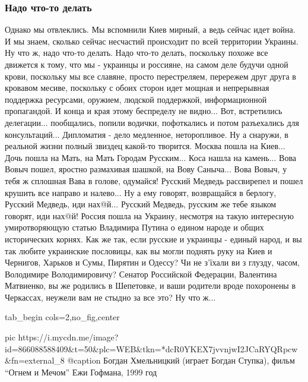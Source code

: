  
 
 
 
 

\subsubsection{Надо что-то делать}

Однако мы отвлеклись. Мы вспомнили Киев мирный, а ведь сейчас идет война. И мы
знаем, сколько сейчас несчастий происходит по всей территории Украины. Ну что
ж, надо что-то делать. Надо что-то делать, поскольку похоже все движется к
тому, что мы - украинцы и россияне, на самом деле будучи одной крови, поскольку
мы все славяне, просто перестреляем, перережем друг друга в кровавом месиве,
поскольку с обоих сторон идет мощная и непрерывная поддержка ресурсами,
оружием, людской поддержкой, информационной пропагандой. И конца и края этому
беспределу не видно... Вот, встретились делегации... пообщались, попили
водички, пофоткались и потом разъехались для консультаций... Дипломатия - дело
медленное, неторопливое. Ну а снаружи, в реальной жизни полный звиздец какой-то
творится. Москва пошла на Киев... Дочь пошла на Мать, на Мать Городам
Русским... Коса нашла на камень... Вова Вовыч пошел, яростно размахивая шашкой,
на Вову Саныча... Вова Вовыч, у тебя ж сплошная Вава в голове, одумайся! Русский Медведь рассвирепел и пошел крушить все направо и
налево... Ну а ему говорят, возвращайся в берлогу, Русский Медведь, иди
нах@й... Русский Медведь, русским же тебе языком говорят, иди нах@й! Россия
пошла на Украину, несмотря на такую интересную умиротворяющую статью Владимира
Путина о едином народе и общих исторических корнях. Как же так, если русские и
украинцы - единый народ, и вы так любите украинские пословицы, как вы могли
поднять руку на Киев и Чернигов, Харьков и Сумы, Пирятин и Одессу? Чи не
з'їхали ви з глузду, часом, Володимире Володимировичу? Сенатор Российской
Федерации, Валентина Матвиенко, вы же родились в Шепетовке, и ваши родители
вроде похоронены в Черкассах, неужели вам не стыдно за все это? Ну что ж... 

\ifcmt
  tab_begin cols=2,no_fig,center

		 pic https://i.mycdn.me/image?id=866088588409&t=50&plc=WEB&tkn=*dcR0YKEX7jvvnjwI2JCaRYQRpcw&fn=external_8
		 @caption Богдан Хмельницкий (играет Богдан Ступка), фильм \enquote{Огнем и Мечом} Ежи Гофмана, 1999 год

